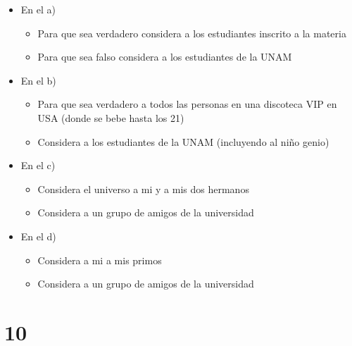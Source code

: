 \documentclass[12pt, fleqn]{article}                            %
\theoremstyle{break}                                            %
\begin{document}
    \begin{itemize}
        
        \item En el a) 
            \begin{itemize}
                \item 
                    Para que sea verdadero considera a los
                    estudiantes inscrito a la materia
                \item
                    Para que sea falso considera a los
                    estudiantes de la UNAM
            \end{itemize}

        \item En el b) 
            \begin{itemize}
                \item 
                    Para que sea verdadero a todos las
                    personas en una discoteca VIP en USA (donde
                    se bebe hasta los 21)
                \item
                    Considera a los estudiantes de la UNAM (incluyendo
                    al niño genio)
            \end{itemize}

        \item En el c) 
            \begin{itemize}
                \item 
                    Considera el universo a mi y a mis dos hermanos
                \item
                    Considera a un grupo de amigos de la universidad
            \end{itemize}

        \item En el d) 
            \begin{itemize}
                \item 
                    Considera a mi a mis primos
                \item
                    Considera a un grupo de amigos de la universidad
            \end{itemize}

    \end{itemize}


\clearpage
\section{10}
\end{document}
